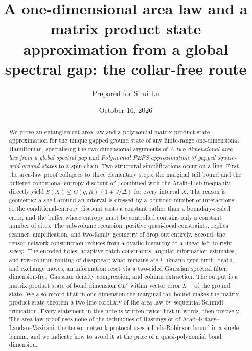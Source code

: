 \documentclass[aps,prx,reprint,superscriptaddress,floatfix,nofootinbib,longbibliography,amsmath,amssymb]{revtex4-2}
\theoremstyle{plain}
\theoremstyle{definition}
\begin{document}
\title{A one-dimensional area law and a matrix product state
approximation from a global spectral gap: the collar-free route}
\author{Prepared for Sirui Lu}
\date{October 16, 2026}

\begin{abstract}
\noindent
We prove an entanglement area law and a polynomial matrix product state
approximation for the unique gapped ground state of any finite-range
one-dimensional Hamiltonian, specialising the two-dimensional arguments
of \emph{A two-dimensional area law from a global spectral gap} \cite{AL}
and \emph{Polynomial PEPS approximation of gapped square-grid ground
states} \cite{PP} to a spin chain. Two structural simplifications occur on
a line. First, the area-law proof collapses to three elementary steps: the
marginal tail bound and the buffered conditional-entropy discount of
\cite[Section~2]{AL}, combined with the Araki--Lieb inequality, directly
yield $S(X)\le C(q,R)\,(1+J/\Delta)$ for every interval $X$. The
reason is geometric: a shell around an interval is crossed by a bounded
number of interactions, so the conditional-entropy discount costs a
constant rather than a boundary-scaled error, and the
buffer whose entropy must be controlled contains only a constant number of
sites. The sub-volume recursion, positive quasi-local constraints, replica
scanner, amplification, and two-family geometry of \cite{AL} drop out
entirely. Second, the tensor-network construction reduces from a dyadic
hierarchy to a linear left-to-right \emph{sweep}. The encoded holes,
adaptive patch constraints, angular information estimates, and row--column
routing of \cite{PP} disappear; what remains are Uhlmann-type birth,
death, and exchange moves, an information reset via a two-sided Gaussian
spectral filter, dimension-free Gaussian density compression, and column
extraction. The output is a matrix product state of bond dimension
$CL^{c}$ within vector error $L^{-1}$ of the ground state. We also record
that in one dimension the marginal tail bound makes the matrix product
state theorem a two-line corollary of the area law by sequential Schmidt
truncation. Every statement in this note is written twice: first in words,
then precisely. The area-law proof uses none of the techniques of Hastings
or of Arad--Kitaev--Landau--Vazirani; the tensor-network protocol uses a
Lieb--Robinson bound in a single lemma, and we indicate how to avoid it at
the price of a quasi-polynomial bond dimension.
\end{abstract}
\maketitle
\end{document}

